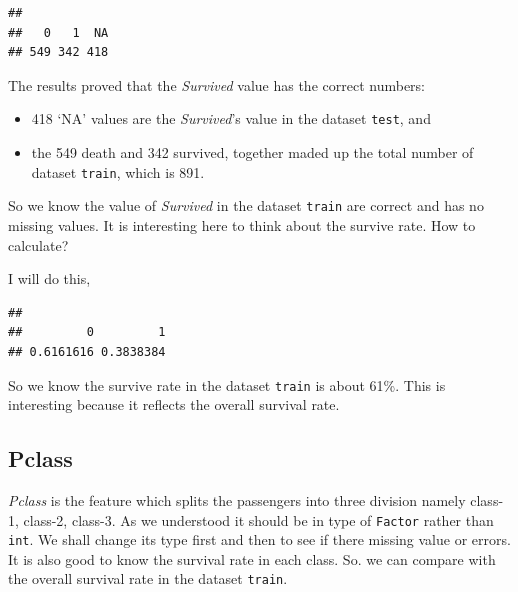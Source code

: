 \documentclass[
]{book}
\newenvironment{Shaded}{\begin{snugshade}}{\end{snugshade}}
\newcommand{\CommentTok}[1]{\textcolor[rgb]{0.56,0.35,0.01}{\textit{#1}}}
\newcommand{\KeywordTok}[1]{\textcolor[rgb]{0.13,0.29,0.53}{\textbf{#1}}}
\newcommand{\NormalTok}[1]{#1}
\newcommand{\OperatorTok}[1]{\textcolor[rgb]{0.81,0.36,0.00}{\textbf{#1}}}
\providecommand{\tightlist}{%
  \setlength{\itemsep}{0pt}\setlength{\parskip}{0pt}}
\begin{document}
\begin{verbatim}
## 
##   0   1  NA 
## 549 342 418
\end{verbatim}

The results proved that the \emph{Survived} value has the correct numbers:

\begin{itemize}
\tightlist
\item
  418 `NA' values are the \emph{Survived}'s value in the dataset \texttt{test}, and
\item
  the 549 death and 342 survived, together maded up the total number of dataset \texttt{train}, which is 891.
\end{itemize}

So we know the value of \emph{Survived} in the dataset \texttt{train} are correct and has no missing values. It is interesting here to think about the survive rate. How to calculate?

I will do this,

\begin{Shaded}
\end{Shaded}

\begin{verbatim}
## 
##         0         1 
## 0.6161616 0.3838384
\end{verbatim}

So we know the survive rate in the dataset \texttt{train} is about 61\%. This is interesting because it reflects the overall survival rate.

\hypertarget{pclass}{%
\subsection{Pclass}\label{pclass}}

\emph{Pclass} is the feature which splits the passengers into three division namely class-1, class-2, class-3. As we understood it should be in type of \texttt{Factor} rather than \texttt{int}. We shall change its type first and then to see if there missing value or errors. It is also good to know the survival rate in each class. So. we can compare with the overall survival rate in the dataset \texttt{train}.
\end{document}
